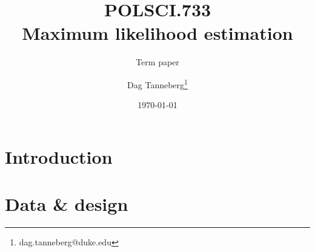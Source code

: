 \documentclass[parskip=half]{scrartcl}\usepackage[]{graphicx}\usepackage[]{color}
\title{POLSCI.733\\Maximum likelihood estimation}
\subtitle{Term paper}
\author{Dag Tanneberg\thanks{%
    dag.tanneberg@duke.edu
  }
}
\date{\today}
\begin{document}
 
\linenumbers

\maketitle
\thispagestyle{empty}
\tableofcontents
\newpage
\onehalfspacing

\section{Introduction}








\section{Data \& design}


\newpage
{}
\printbibliography
\end{document}
